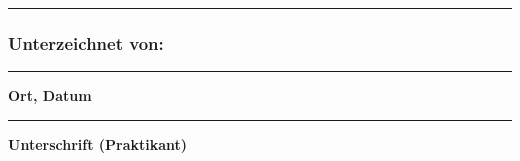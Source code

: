 \documentclass[
]{article}
\begin{document}
\begin{center}\rule{0.5\linewidth}{0.5pt}\end{center}

\subsubsection{Unterzeichnet von:}\label{unterzeichnet-von}

\hfill\break
\hfill\break
\hfill\break
\hfill\break

\begin{center}\rule{0.5\linewidth}{0.5pt}\end{center}

\textbf{Ort, Datum}

\hfill\break
\hfill\break
\hfill\break
\hfill\break

\begin{center}\rule{0.5\linewidth}{0.5pt}\end{center}

\textbf{Unterschrift (Praktikant)}
\end{document}

